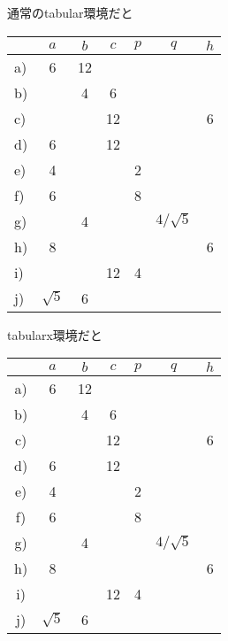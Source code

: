 \documentclass{jsarticle}
\begin{document}
\clearpage
\renewcommand{\arraystretch}{1.5}

通常のtabular環境だと
\begin{tabular}{|l|c|c|c|c|c|c|} \hline
   &       $a$  & $b$ & $c$ & $p$ &         $q$  & $h$ \\ \hline\hline
a) &        6   &  12 &     &     &              &     \\ \hline
b) &            &   4 &   6 &     &              &     \\ \hline
c) &            &     &  12 &     &              &  6  \\ \hline
d) &        6   &     &  12 &     &              &     \\ \hline
e) &        4   &     &     &   2 &              &     \\ \hline
f) &        6   &     &     &   8 &              &     \\ \hline
g) &            &   4 &     &     & $4/\sqrt{5}$ &     \\ \hline
h) &        8   &     &     &     &              &  6  \\ \hline
i) &            &     &  12 &   4 &              &     \\ \hline
j) & $\sqrt{5}$ &   6 &     &     &              &     \\ \hline
\end{tabular}

tabularx環境だと
\begin{tabularx}{100mm}{*{7}{|C}|} \hline
   &       $a$  & $b$ & $c$ & $p$ &         $q$  & $h$ \\ \hline\hline
a) &        6   &  12 &     &     &              &     \\ \hline
b) &            &   4 &   6 &     &              &     \\ \hline
c) &            &     &  12 &     &              &  6  \\ \hline
d) &        6   &     &  12 &     &              &     \\ \hline
e) &        4   &     &     &   2 &              &     \\ \hline
f) &        6   &     &     &   8 &              &     \\ \hline
g) &            &   4 &     &     & $4/\sqrt{5}$ &     \\ \hline
h) &        8   &     &     &     &              &  6  \\ \hline
i) &            &     &  12 &   4 &              &     \\ \hline
j) & $\sqrt{5}$ &   6 &     &     &              &     \\ \hline
\end{tabularx}
\end{document}

